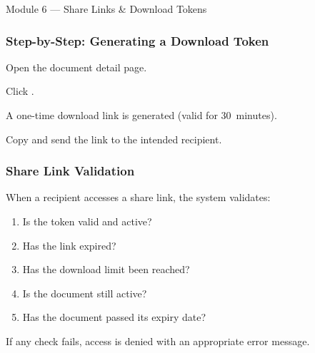 \begin{ugModule}{Module 6 --- Share Links \& Download Tokens}
  \subsubsection*{Step-by-Step: Generating a Download Token}
  \begin{ugSteps}
    \item Open the document detail page.
    \item Click .
    \item A one-time download link is generated (valid for
          30~minutes).
    \item Copy and send the link to the intended recipient.
  \end{ugSteps}

  \subsubsection*{Share Link Validation}
  When a recipient accesses a share link, the system validates:
  \begin{enumerate}[leftmargin=18pt]
    \item Is the token valid and active?
    \item Has the link expired?
    \item Has the download limit been reached?
    \item Is the document still active?
    \item Has the document passed its expiry date?
  \end{enumerate}

  If any check fails, access is denied with an appropriate
  error message.
\end{ugModule}

\vspace{10pt}

